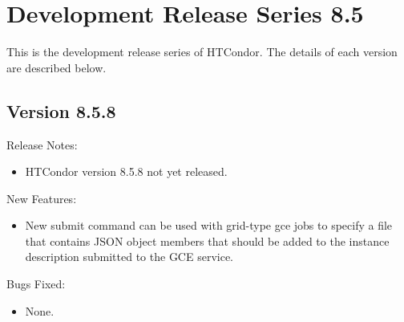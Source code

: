 
\section{\label{sec:History-8-5}Development Release Series 8.5}

This is the development release series of HTCondor.
The details of each version are described below.

\subsection*{\label{sec:New-8-5-8}Version 8.5.8}

\noindent Release Notes:

\begin{itemize}

\item HTCondor version 8.5.8 not yet released.

\end{itemize}


\noindent New Features:

\begin{itemize}

\item New submit command  can be used with
grid-type gce jobs to specify a file that contains JSON object members
that should be added to the instance description submitted to the GCE
service.

\end{itemize}

\noindent Bugs Fixed:

\begin{itemize}

\item None.

\end{itemize}

